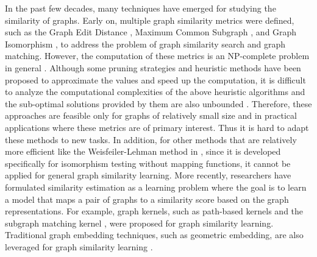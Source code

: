 In the past few decades, many techniques have emerged for studying the similarity of graphs. Early on, multiple graph similarity metrics were defined, such as the Graph Edit Distance , Maximum Common Subgraph , and Graph Isomorphism , to address the problem of graph similarity search and graph matching. However, the computation of these metrics is an NP-complete problem in general . Although some pruning strategies and heuristic methods have been proposed to approximate the values and speed up the computation, it is difficult to analyze the computational complexities of the above heuristic algorithms and the sub-optimal solutions provided by them are also unbounded . Therefore, these approaches are feasible only for graphs of relatively small size and in practical applications where these metrics are of primary interest. Thus it is hard to adapt these methods to new tasks. In addition, for other methods that are relatively more efficient like the Weisfeiler-Lehman method in , since it is developed specifically for isomorphism testing without mapping functions, it cannot be applied for general graph similarity learning. More recently, researchers have formulated similarity estimation as a learning problem where the goal is to learn a model that maps a pair of graphs to a similarity score based on the graph representations. For example, graph kernels, such as path-based kernels  and the subgraph matching kernel , were proposed for graph similarity learning.  Traditional graph embedding techniques, such as geometric embedding, are also leveraged for graph similarity learning . 
